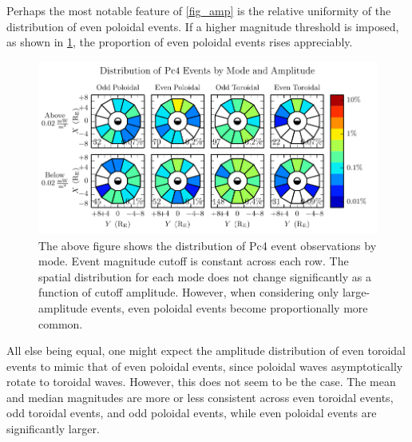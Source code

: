 

Perhaps the most notable feature of \cref{fig_amp} is the relative uniformity
of the distribution of even poloidal events. If a higher magnitude threshold is
imposed, as shown in \cref{fig_mode_amp}, the proportion of even poloidal
events rises appreciably. 

\begin{figure}[!htb]
  \centering
  \includegraphics[width=\textwidth]{figures/mode_amp.pdf}
  \caption[Rate of Pc4 Events by Mode and Amplitude]{
    The above figure shows the distribution of Pc4 event observations by mode.
    Event magnitude cutoff is constant across each row. The spatial
    distribution for
    each mode does not change significantly as a function of cutoff amplitude.
    However, when considering only large-amplitude events, even poloidal events
    become proportionally more common. 
  }
  \label{fig_mode_amp}
\end{figure}

All else being equal, one might expect the amplitude distribution of even
toroidal events to mimic that of even poloidal events, since poloidal waves
asymptotically rotate to toroidal waves. However, this does not seem to be the
case. The mean and median magnitudes are more or less consistent across even
toroidal events, odd toroidal events, and odd poloidal events, while even
poloidal events are significantly larger. 


